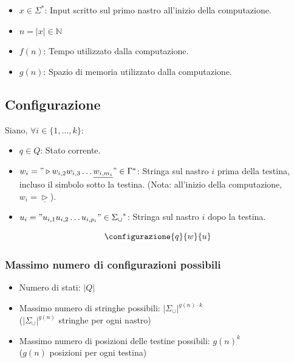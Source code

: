 \hrulefill

\begin{itemize}
    \item $x \in \Sigma^*$: Input scritto sul primo nastro all'inizio della computazione.
    \item $n = |x| \in \mathbb{N}$
    \item $f(n)$: Tempo utilizzato dalla computazione.
    \item $g(n)$: Spazio di memoria utilizzato dalla computazione.
\end{itemize}



\subsection{Configurazione}
Siano, $\forall i \in \{1, \dots, k\}$:
\begin{itemize}
    \item $q \in Q$: Stato corrente.
    \item $w_i = "\triangleright w_{i,2} w_{i,3} \dots \underline{w_{i,{m_i}}}" \in \Gamma^*$: Stringa sul nastro $i$ prima della testina, incluso il simbolo sotto la testina.
    (Nota: all'inizio della computazione, $w_i = \underline{\triangleright}$).
    \item $u_i = "u_{i,1} u_{i,2} \dots u_{i,{p_i}}" \in {\Sigma_\cup}^*$: Stringa sul nastro $i$ dopo la testina.
\end{itemize}

\[
\configurazione{q}{w}{u}
\]

\subsubsection{Massimo numero di configurazioni possibili}
\begin{itemize}
    \item Numero di stati: $|Q|$
    \item Massimo numero di stringhe possibili: $|\Sigma_\cup|^{g(n) \cdot k}$ \\
    ($|\Sigma_\cup|^{g(n)}$ stringhe per ogni nastro)
    \item Massimo numero di posizioni delle testine possibili: $g(n)^k$ \\
    ($g(n)$ posizioni per ogni testina)
\end{itemize}

